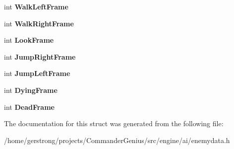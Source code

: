 \begin{DoxyCompactItemize}
\item 
\hypertarget{structst_vort_data_ab2315c31d821caebc7ce5dda72bf221c}{
int {\bfseries WalkLeftFrame}}
\label{structst_vort_data_ab2315c31d821caebc7ce5dda72bf221c}

\item 
\hypertarget{structst_vort_data_ae1f7023dfac6217ceb5e8f97c202cfac}{
int {\bfseries WalkRightFrame}}
\label{structst_vort_data_ae1f7023dfac6217ceb5e8f97c202cfac}

\item 
\hypertarget{structst_vort_data_a91b315431f1c7e3a4f2363ff53873760}{
int {\bfseries LookFrame}}
\label{structst_vort_data_a91b315431f1c7e3a4f2363ff53873760}

\item 
\hypertarget{structst_vort_data_acef63d6b0e0919136582f26609db9387}{
int {\bfseries JumpRightFrame}}
\label{structst_vort_data_acef63d6b0e0919136582f26609db9387}

\item 
\hypertarget{structst_vort_data_a36bfd51cff7a1bc7fd929612fbe20d04}{
int {\bfseries JumpLeftFrame}}
\label{structst_vort_data_a36bfd51cff7a1bc7fd929612fbe20d04}

\item 
\hypertarget{structst_vort_data_acb0e2f42509a55ea0ec546cfecf3bfcf}{
int {\bfseries DyingFrame}}
\label{structst_vort_data_acb0e2f42509a55ea0ec546cfecf3bfcf}

\item 
\hypertarget{structst_vort_data_a4666528221c1018e3678a037ed32b969}{
int {\bfseries DeadFrame}}
\label{structst_vort_data_a4666528221c1018e3678a037ed32b969}

\end{DoxyCompactItemize}


The documentation for this struct was generated from the following file:\begin{DoxyCompactItemize}
\item 
/home/gerstrong/projects/CommanderGenius/src/engine/ai/enemydata.h\end{DoxyCompactItemize}
